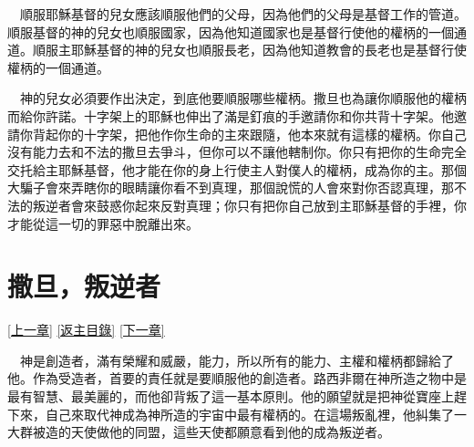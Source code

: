 \documentclass{book}
\begin{document}
　順服耶穌基督的兒女應該順服他們的父母，因為他們的父母是基督工作的管道。順服基督的神的兒女也順服國家，因為他知道國家也是基督行使他的權柄的一個通道。順服主耶穌基督的神的兒女也順服長老，因為他知道教會的長老也是基督行使權柄的一個通道。

　神的兒女必須要作出決定，到底他要順服哪些權柄。撒旦也為讓你順服他的權柄而給你許諾。十字架上的耶穌也伸出了滿是釘痕的手邀請你和你共背十字架。他邀請你背起你的十字架，把他作你生命的主來跟隨，他本來就有這樣的權柄。你自己沒有能力去和不法的撒旦去爭斗，但你可以不讓他轄制你。你只有把你的生命完全交托給主耶穌基督，他才能在你的身上行使主人對僕人的權柄，成為你的主。那個大騙子會來弄瞎你的眼睛讓你看不到真理，那個說慌的人會來對你否認真理，那不法的叛逆者會來鼓惑你起來反對真理；你只有把你自己放到主耶穌基督的手裡，你才能從這一切的罪惡中脫離出來。

\chapter{撒旦，叛逆者}
\label{sec:ch09}
\hyperref[sec:ch08]{[上一章]}
\hyperlink{toc}{[返主目錄]}
\hyperref[sec:ch10]{[下一章]}

\begin{center}
\noindent{}
\end{center}

　神是創造者，滿有榮耀和威嚴，能力，所以所有的能力、主權和權柄都歸給了他。作為受造者，首要的責任就是要順服他的創造者。路西非爾在神所造之物中是最有智慧、最美麗的，而他卻背叛了這一基本原則。他的願望就是把神從寶座上趕下來，自己來取代神成為神所造的宇宙中最有權柄的。在這場叛亂裡，他糾集了一大群被造的天使做他的同盟，這些天使都願意看到他的成為叛逆者。
\end{document}
